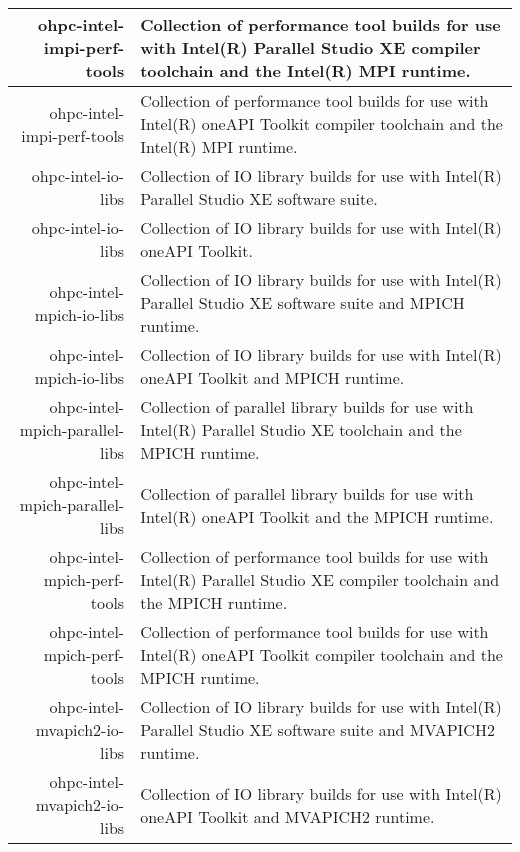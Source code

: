 \begin{tabularx}{\textwidth}{r|X}
\hline
ohpc-intel-impi-perf-tools & Collection of performance tool builds for use with Intel(R) Parallel Studio XE compiler toolchain and the Intel(R) MPI runtime. \\
\hline
ohpc-intel-impi-perf-tools & Collection of performance tool builds for use with Intel(R) oneAPI Toolkit compiler toolchain and the Intel(R) MPI runtime. \\
\hline
ohpc-intel-io-libs & Collection of IO library builds for use with Intel(R) Parallel Studio XE software suite. \\
\hline
ohpc-intel-io-libs & Collection of IO library builds for use with Intel(R) oneAPI Toolkit. \\
\hline
ohpc-intel-mpich-io-libs & Collection of IO library builds for use with Intel(R) Parallel Studio XE software suite and MPICH runtime. \\
\hline
ohpc-intel-mpich-io-libs & Collection of IO library builds for use with Intel(R) oneAPI Toolkit and MPICH runtime. \\
\hline
ohpc-intel-mpich-parallel-libs & Collection of parallel library builds for use with Intel(R) Parallel Studio XE toolchain and the MPICH runtime. \\
\hline
ohpc-intel-mpich-parallel-libs & Collection of parallel library builds for use with Intel(R) oneAPI Toolkit and the MPICH runtime. \\
\hline
ohpc-intel-mpich-perf-tools & Collection of performance tool builds for use with Intel(R) Parallel Studio XE compiler toolchain and the MPICH runtime. \\
\hline
ohpc-intel-mpich-perf-tools & Collection of performance tool builds for use with Intel(R) oneAPI Toolkit compiler toolchain and the MPICH runtime. \\
\hline
ohpc-intel-mvapich2-io-libs & Collection of IO library builds for use with Intel(R) Parallel Studio XE software suite and MVAPICH2 runtime. \\
\hline
ohpc-intel-mvapich2-io-libs & Collection of IO library builds for use with Intel(R) oneAPI Toolkit and MVAPICH2 runtime. \\
\hline
\bottomrule
\end{tabularx}
